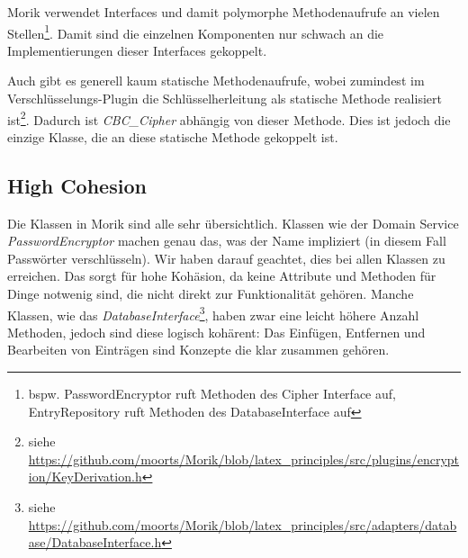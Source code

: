 Morik verwendet Interfaces und damit polymorphe Methodenaufrufe an vielen Stellen\footnote{bspw. PasswordEncryptor ruft Methoden des Cipher Interface auf, EntryRepository ruft Methoden des DatabaseInterface auf}. Damit sind die einzelnen Komponenten nur schwach an die Implementierungen dieser Interfaces gekoppelt.

Auch gibt es generell kaum statische Methodenaufrufe, wobei zumindest im Verschlüsselungs-Plugin die Schlüsselherleitung als statische Methode realisiert ist\footnote{siehe \url{https://github.com/moorts/Morik/blob/latex_principles/src/plugins/encryption/KeyDerivation.h}}. Dadurch ist \textit{CBC\_Cipher} abhängig von dieser Methode. Dies ist jedoch die einzige Klasse, die an diese statische Methode gekoppelt ist.

\subsection{High Cohesion}

Die Klassen in Morik sind alle sehr übersichtlich. Klassen wie der Domain Service \textit{PasswordEncryptor} machen genau das, was der Name impliziert (in diesem Fall Passwörter verschlüsseln). Wir haben darauf geachtet, dies bei allen Klassen zu erreichen. Das sorgt für hohe Kohäsion, da keine Attribute und Methoden für Dinge notwenig sind, die nicht direkt zur Funktionalität gehören. Manche Klassen, wie das \textit{DatabaseInterface}\footnote{siehe \url{https://github.com/moorts/Morik/blob/latex_principles/src/adapters/database/DatabaseInterface.h}}, haben zwar eine leicht höhere Anzahl Methoden, jedoch sind diese logisch kohärent: Das Einfügen, Entfernen und Bearbeiten von Einträgen sind Konzepte die klar zusammen gehören.
